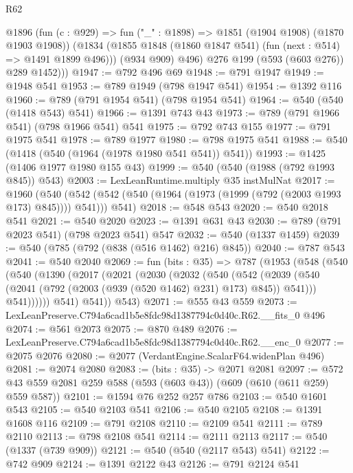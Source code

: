 \begin{lexlean}{R62}
\begin{coremodule}
          @1896
            (fun (c : @929) => fun ("_" : @1898) => @1851 (@1904 @1908) (@1870 @1903 @1908))
            (@1834 (@1855 @1848 (@1860 @1847 @541) (fun (next : @514) => @1491 @1899 @496)))
            (@934 @909)
            @496)
          @276
          @199
          (@593 (@603 @276))
          @289
          @1452)))
@1947 := @792 @496 @69
@1948 := @791 @1947
@1949 := @1948 @541
@1953 := @789 @1949 (@798 @1947 @541)
@1954 := @1392 @116
@1960 := @789 (@791 @1954 @541) (@798 @1954 @541)
@1964 := @540 (@540 (@1418 @543) @541)
@1966 := @1391 @743 @43
@1973 := @789 (@791 @1966 @541) (@798 @1966 @541) @541
@1975 := @792 @743 @155
@1977 := @791 @1975 @541
@1978 := @789 @1977
@1980 := @798 @1975 @541
@1988 := @540 (@1418 (@540 (@1964 (@1978 @1980 @541 @541)) @541))
@1993 := @1425 (@1406 @1977 @1980 @155 @43)
@1999 := @540 (@540 (@1988 (@792 @1993 @845)) @543)
@2003 := LexLeanRuntime.multiply @35 instMulNat
@2017 := @1960
    (@540 (@542 (@542 (@540 (@1964 (@1973 (@1999 (@792 (@2003 @1993 @173) @845)))) @541))) @541)
@2018 := @548 @543
@2020 := @540 @2018 @541
@2021 := @540 @2020
@2023 := @1391 @631 @43
@2030 := @789 (@791 @2023 @541) (@798 @2023 @541) @547
@2032 := @540 (@1337 @1459)
@2039 := @540 (@785 (@792 (@838 (@516 @1462) @216) @845))
@2040 := @787 @543
@2041 := @540 @2040
@2069 := fun (bits : @35) =>
  @787
    (@1953
      (@548
        (@540
          (@540
            (@1390
              (@2017
                (@2021
                  (@2030
                    (@2032
                      (@540
                        (@542
                          (@2039
                            (@540 (@2041 (@792 (@2003 (@939 (@520 @1462) @231) @173) @845)) @541)))
                        @541))))))
            @541)
          @541))
      @543)
@2071 := @555 @43 @559
@2073 := LexLeanPreserve.C794a6cad1b5e8fdc98d1387794c0d40c.R62.__fits_0 @496
@2074 := @561 @2073
@2075 := @870 @489
@2076 := LexLeanPreserve.C794a6cad1b5e8fdc98d1387794c0d40c.R62.__enc_0
@2077 := @2075 @2076
@2080 := @2077 (VerdantEngine.ScalarF64.widenPlan @496)
@2081 := @2074 @2080
@2083 := (bits : @35) -> @2071 @2081
@2097 := @572 @43 @559 @2081 @259 @588 (@593 (@603 @43)) (@609 (@610 (@611 @259) @559 @587))
@2101 := @1594 @76 @252 @257 @786
@2103 := @540 @1601 @543
@2105 := @540 @2103 @541
@2106 := @540 @2105
@2108 := @1391 @1608 @116
@2109 := @791 @2108
@2110 := @2109 @541
@2111 := @789 @2110
@2113 := @798 @2108 @541
@2114 := @2111 @2113
@2117 := @540 (@1337 (@739 @909))
@2121 := @540 (@540 (@2117 @543) @541)
@2122 := @742 @909
@2124 := @1391 @2122 @43
@2126 := @791 @2124 @541

\end{coremodule}
\end{lexlean}

